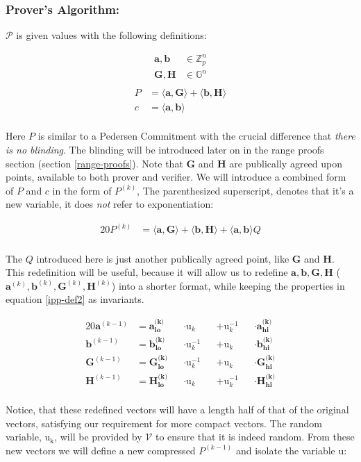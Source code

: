 \documentclass{article}
\newcommand{\eq}[1]{\begin{alignat*}{20}#1\end{alignat*}}
\newcommand{\eqn}[2]{\begin{equation}\label{#1}\begin{split}#2\end{split}\end{equation}}
\renewcommand{\vec}[1]{\boldsymbol{#1}}
\newcommand{\ran}[1]{\mathrm{#1}}
\newcommand{\V}{\mathcal{V}}
\renewcommand{\P}{\mathcal{P}}
\newcommand{\G}{\mathbb{G}}
\newcommand{\Z}{\mathbb{Z}}
\newcommand{\dotp}[2]{\langle #1, #2 \rangle}
\newcommand{\opn}[1]{\operatorname{#1}}
\newcommand{\veclo}[1]{\vec{#1_{\opn{lo}}}}
\newcommand{\vechi}[1]{\vec{#1_{\opn{hi}}}}
\begin{document}
\subsubsection{Prover's Algorithm:}
$\P$ is given values with the following definitions:

\eqn{ipp-def1}{
	\vec{a}, \vec{b} &\in \Z^n_p \\
	\vec{G}, \vec{H} &\in \G^n \\
}
\eqn{ipp-def2}{
	P &= \dotp{\vec{a}}{\vec{G}} + \dotp{\vec{b}}{\vec{H}} \\
	c &= \dotp{\vec{a}}{\vec{b}} \\
}

Here $P$ is similar to a Pedersen Commitment with the crucial difference
that \textit{there is no blinding}. The blinding will be introduced
later on in the range proofs section (section \ref{range-proofs}). Note
that $\vec{G}$ and $\vec{H}$ are publically agreed upon points,
available to both prover and verifier. We will introduce a combined
form of $P$ and $c$ in the form of $P^{(k)}$, The parenthesized
superscript, denotes that it's a new variable, it does \textit{not}
refer to exponentiation:

\eq{
	P^{(k)} &= \dotp{\vec{a}}{\vec{G}} +
	           \dotp{\vec{b}}{\vec{H}} +
	           \dotp{\vec{a}}{\vec{b}}Q \\
} 

The $Q$ introduced here is just another publically agreed point,
like $\vec{G}$ and $\vec{H}$. This redefinition will be useful, because
it will allow us to redefine $\vec{a}, \vec{b}, \vec{G}, \vec{H}$
($\vec{a}^{(k)}, \vec{b}^{(k)}, \vec{G}^{(k)}, \vec{H}^{(k)}$) into a
shorter format, while keeping the properties in equation \ref{ipp-def2}
as invariants.

\eq{
	\vec{a}^{(k-1)} &= \veclo{a^{\text{(k)}}} &&\cdot \ran{u}_k      &&+ \ran{u}^{-1}_k &&\cdot \vechi{a^{\text{(k)}}} \\
	\vec{b}^{(k-1)} &= \veclo{b^{\text{(k)}}} &&\cdot \ran{u}^{-1}_k &&+ \ran{u}_k      &&\cdot \vechi{b^{\text{(k)}}} \\
	\vec{G}^{(k-1)} &= \veclo{G^{\text{(k)}}} &&\cdot \ran{u}^{-1}_k &&+ \ran{u}_k      &&\cdot \vechi{G^{\text{(k)}}} \\
	\vec{H}^{(k-1)} &= \veclo{H^{\text{(k)}}} &&\cdot \ran{u}_k      &&+ \ran{u}^{-1}_k &&\cdot \vechi{H^{\text{(k)}}} \\
}

Notice, that these redefined vectors will have a length half of that
of the original vectors, satisfying our requirement for more compact
vectors. The random variable, $\ran{u_k}$, will be provided by $\V$
to ensure that it is indeed random. From these new vectors we will
define a new compressed $P^{(k-1)}$ and isolate the variable $\ran{u}$:
\end{document}
